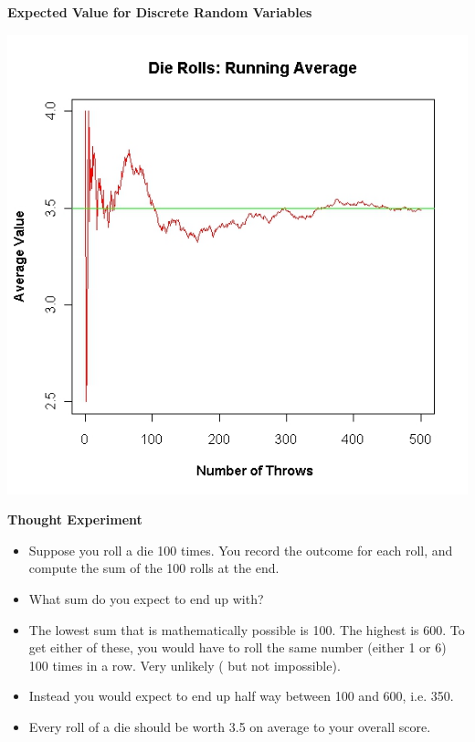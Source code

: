 \documentclass[00-IntroStatsMaster.tex]{subfiles}
\begin{document}
	
	{
		\textbf{Expected Value for Discrete Random Variables}
		
		\begin{center}
			\includegraphics[scale=0.4]{images/2BDieMean}
		\end{center}
		
	}
	{
		\textbf{Thought Experiment}
		
		\begin{itemize}
			\item Suppose you roll a die 100 times. You record the outcome for each roll, and compute the sum of the 100 rolls at the end.
			\item What sum do you expect to end up with?
			\item The lowest sum that is mathematically possible is 100. The highest is 600. To get either of these, you would have to roll the same number (either 1 or 6) 100 times in a row. Very unlikely ( but not impossible).
			\item Instead you would expect to end up half way between 100 and 600, i.e. 350.
			\item Every roll of a die should be worth 3.5 on average to your overall score.
		\end{itemize}
	}
	
\end{document}
